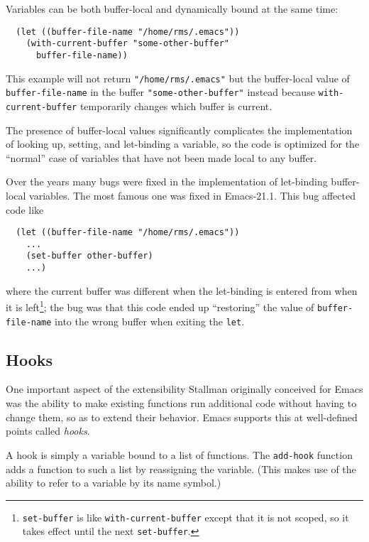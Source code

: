 \documentclass[format=acmsmall, review=false, screen=true]{acmart}
\begin{document}
Variables can be both buffer-local and dynamically bound at the same time:
\begin{verbatim}
  (let ((buffer-file-name "/home/rms/.emacs"))
    (with-current-buffer "some-other-buffer"
      buffer-file-name))
\end{verbatim}
This example will not return \texttt{"/home/rms/.emacs"} but the
buffer-local value of \texttt{buffer-file-name} in the buffer
\texttt{"some-other-buffer"} instead because \texttt{with-current-buffer}
temporarily changes which buffer is current.

The presence of buffer-local values significantly complicates the
implementation of looking up, setting, and let-binding a variable, so the
code is optimized for the ``normal'' case of variables that have not been
made local to any buffer.

Over the years many bugs were fixed in the implementation of let-binding
buffer-local variables.  The most famous one was fixed in Emacs-21.1.
This bug affected code like
\begin{verbatim}
  (let ((buffer-file-name "/home/rms/.emacs"))
    ...
    (set-buffer other-buffer)
    ...)
\end{verbatim}
where the current buffer was different when the let-binding is entered from
when it is left\footnote{\texttt{set-buffer} is like
  \texttt{with-current-buffer} except that it is not scoped, so it takes
  effect until the next \texttt{set-buffer}.}; the bug was that this code
ended up ``restoring'' the value of \texttt{buffer-file-name} into the
wrong buffer when exiting the \texttt{let}.

\subsection{Hooks}
\label{sec:hooks}

One important aspect of the extensibility Stallman originally
conceived for Emacs was the ability to make existing functions run
additional code without having to change them, so as to extend their
behavior.  Emacs supports this at well-defined points called
\emph{hooks}.

A hook is simply a variable bound to a list of functions.  The
\texttt{add-hook} function adds a function to such a list by
reassigning the variable.  (This makes use of the ability to refer to
a variable by its name symbol.)
\end{document}
